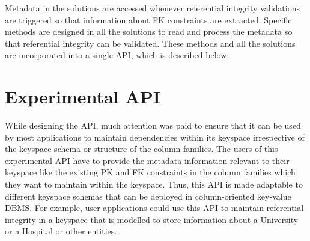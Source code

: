 
Metadata in the solutions are accessed whenever referential integrity
validations are triggered so that information about \ac{FK} constraints are
extracted.  Specific methods are designed in all the solutions to read and
process the metadata so that referential integrity can be validated.  These
methods and all the solutions are incorporated into a single \ac{API}, which is
described below. 

\section{Experimental API}\label{s:API}
While designing the \ac{API}, much attention was paid to ensure that it can be
used by most applications to maintain dependencies within its keyspace
irrespective of the keyspace schema or structure of the column families. 
The users of this experimental \ac{API}  have to provide the metadata
information relevant to their keyspace like the existing \ac{PK}
and \ac{FK} constraints in the column families which they want to maintain
within the keyspace. 
Thus, this \ac{API}
is made adaptable to different keyspace schemas  that can be deployed in
column-oriented key-value \ac{DBMS}.  For example, user applications could use
this \ac{API} to maintain referential integrity in a keyspace that is modelled
to store information about a University or a Hospital or other entities.  

